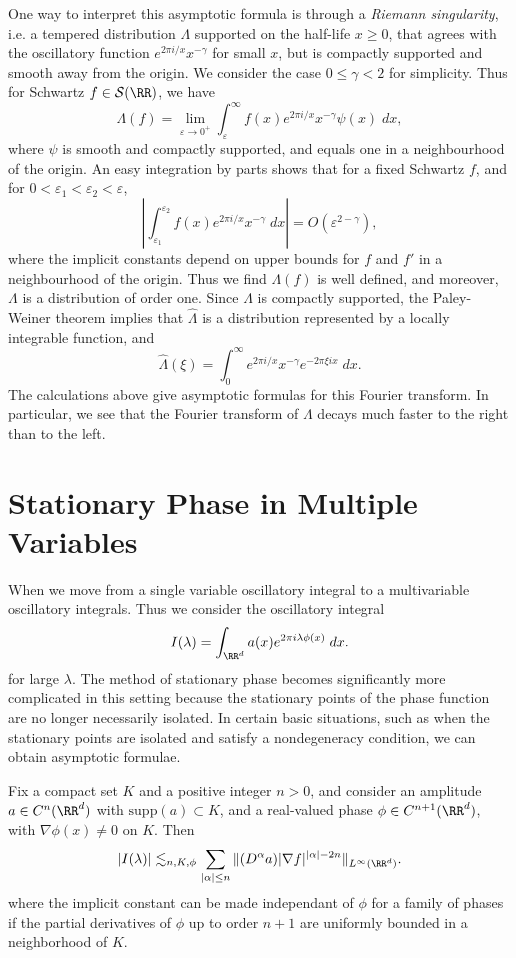 \begin{example}
  One way to interpret this asymptotic formula is through a \emph{Riemann singularity}, i.e. a tempered distribution $\Lambda$ supported on the half-life $x \geq 0$, that agrees with the oscillatory function $e^{2 \pi i/x} x^{-\gamma}$ for small $x$, but is compactly supported and smooth away from the origin. We consider the case $0 \leq \gamma < 2$ for simplicity. Thus for Schwartz $f \in \mathcal{S}(\RR)$, we have
  \[ \Lambda(f) = \lim_{\varepsilon \to 0^+} \int_\varepsilon^\infty f(x) e^{2 \pi i/x} x^{-\gamma} \psi(x)\; dx, \]
  where $\psi$ is smooth and compactly supported, and equals one in a neighbourhood of the origin. An easy integration by parts shows that for a fixed Schwartz $f$, and for $0 < \varepsilon_1 < \varepsilon_2 < \varepsilon$,
  \[ \left| \int_{\varepsilon_1}^{\varepsilon_2} f(x) e^{2 \pi i/x} x^{-\gamma}\; dx \right| = O\left(\varepsilon^{2-\gamma} \right), \]
  where the implicit constants depend on upper bounds for $f$ and $f'$ in a neighbourhood of the origin. Thus we find $\Lambda(f)$ is well defined, and moreover, $\Lambda$ is a distribution of order one. Since $\Lambda$ is compactly supported, the Paley-Weiner theorem implies that $\widehat{\Lambda}$ is a distribution represented by a locally integrable function, and
  \[ \widehat{\Lambda}(\xi) = \int_0^\infty e^{2 \pi i/x} x^{-\gamma} e^{-2 \pi \xi i x}\; dx. \]
  The calculations above give asymptotic formulas for this Fourier transform. In particular, we see that the Fourier transform of $\Lambda$ decays much faster to the right than to the left.
\end{example}

\section{Stationary Phase in Multiple Variables}

When we move from a single variable oscillatory integral to a multivariable oscillatory integrals. Thus we consider the oscillatory integral
%
\[ I(\lambda) = \int_{\RR^d} a(x) e^{2 \pi i \lambda \phi(x)}\; dx. \]
%
for large $\lambda$. The method of stationary phase becomes significantly more complicated in this setting because the stationary points of the phase function are no longer necessarily isolated. In certain basic situations, such as when the stationary points are isolated and satisfy a nondegeneracy condition, we can obtain asymptotic formulae.

\begin{theorem}
    Fix a compact set $K$ and a positive integer $n > 0$, and consider an amplitude $a \in C^n(\RR^d)$ with $\text{supp}(a) \subset K$, and a real-valued phase $\phi \in C^{n+1}(\RR^d)$, with $\nabla \phi(x) \neq 0$ on $K$. Then
    \[ |I(\lambda)| \lesssim_{n,K,\phi} \sum_{|\alpha| \leq n} \| (D^\alpha a) |\nabla f|^{|\alpha| - 2n} \|_{L^\infty(\RR^d)}. \]
    where the implicit constant can be made independant of $\phi$ for a family of phases if the partial derivatives of $\phi$ up to order $n+1$ are uniformly bounded in a neighborhood of $K$.
\end{theorem}

